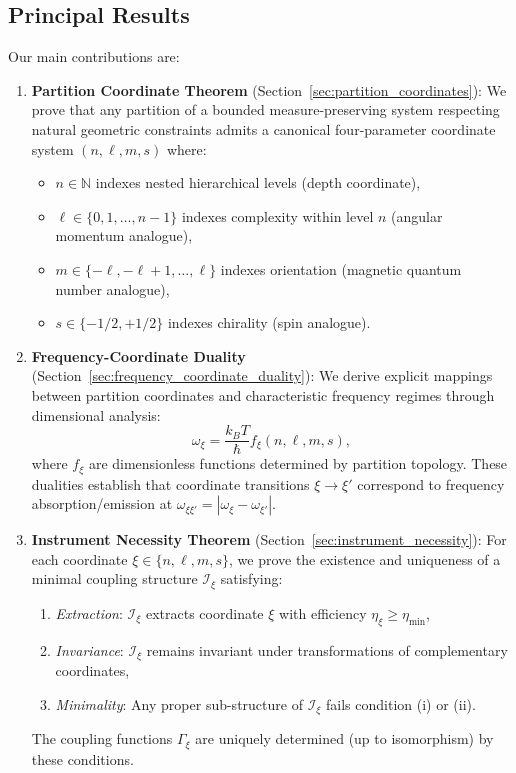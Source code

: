 \documentclass[twocolumn,10pt,a4paper]{article}
\theoremstyle{remark}
\begin{document}
\subsection{Principal Results}

Our main contributions are:

\begin{enumerate}
    \item \textbf{Partition Coordinate Theorem} (Section~\ref{sec:partition_coordinates}): We prove that any partition of a bounded measure-preserving system respecting natural geometric constraints admits a canonical four-parameter coordinate system $(n,\ell,m,s)$ where:
    \begin{itemize}
        \item $n \in \mathbb{N}$ indexes nested hierarchical levels (depth coordinate),
        \item $\ell \in \{0, 1, \ldots, n-1\}$ indexes complexity within level $n$ (angular momentum analogue),
        \item $m \in \{-\ell, -\ell+1, \ldots, \ell\}$ indexes orientation (magnetic quantum number analogue),
        \item $s \in \{-1/2, +1/2\}$ indexes chirality (spin analogue).
    \end{itemize}
    
    \item \textbf{Frequency-Coordinate Duality} (Section~\ref{sec:frequency_coordinate_duality}): We derive explicit mappings between partition coordinates and characteristic frequency regimes through dimensional analysis:
    \begin{equation}
    \omega_\xi = \frac{k_B T}{\hbar} f_\xi(n, \ell, m, s),
    \end{equation}
    where $f_\xi$ are dimensionless functions determined by partition topology. These dualities establish that coordinate transitions $\xi \to \xi'$ correspond to frequency absorption/emission at $\omega_{\xi\xi'} = |\omega_\xi - \omega_{\xi'}|$.
    
    \item \textbf{Instrument Necessity Theorem} (Section~\ref{sec:instrument_necessity}): For each coordinate $\xi \in \{n,\ell,m,s\}$, we prove the existence and uniqueness of a minimal coupling structure $\mathcal{I}_\xi$ satisfying:
    \begin{enumerate}[label=(\roman*)]
        \item \emph{Extraction}: $\mathcal{I}_\xi$ extracts coordinate $\xi$ with efficiency $\eta_\xi \geq \eta_{\min}$,
        \item \emph{Invariance}: $\mathcal{I}_\xi$ remains invariant under transformations of complementary coordinates,
        \item \emph{Minimality}: Any proper sub-structure of $\mathcal{I}_\xi$ fails condition (i) or (ii).
    \end{enumerate}
    The coupling functions $\Gamma_\xi$ are uniquely determined (up to isomorphism) by these conditions.
    

\end{enumerate}
\end{document}
